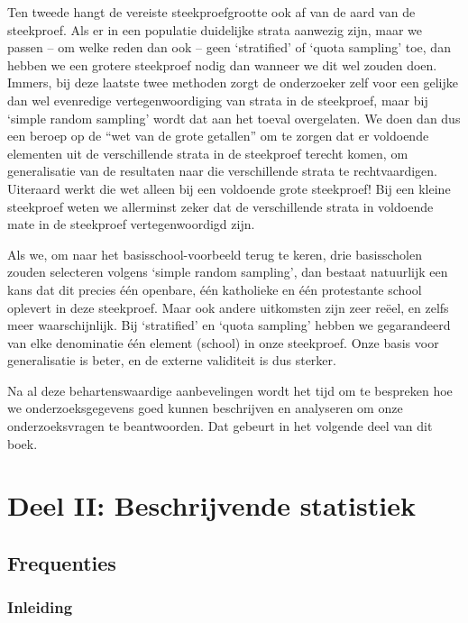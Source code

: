 \documentclass[
]{book}
\begin{document}
Ten tweede hangt de vereiste steekproefgrootte ook af van de aard van de
steekproef. Als er in een populatie duidelijke strata aanwezig zijn,
maar we passen -- om welke reden dan ook -- geen `stratified' of `quota
sampling' toe, dan hebben we een grotere steekproef nodig dan wanneer we
dit wel zouden doen. Immers, bij deze laatste twee methoden zorgt de
onderzoeker zelf voor een gelijke dan wel evenredige vertegenwoordiging
van strata in de steekproef, maar bij `simple random sampling' wordt dat
aan het toeval overgelaten. We doen dan dus een beroep op de ``wet van de
grote getallen'' om te zorgen dat er voldoende elementen uit de
verschillende strata in de steekproef terecht komen, om generalisatie
van de resultaten naar die verschillende strata te rechtvaardigen.
Uiteraard werkt die wet alleen bij een voldoende grote steekproef! Bij
een kleine steekproef weten we allerminst zeker dat de verschillende
strata in voldoende mate in de steekproef vertegenwoordigd zijn.

Als we, om naar het basisschool-voorbeeld terug te keren, drie
basisscholen zouden selecteren volgens `simple random sampling', dan
bestaat natuurlijk een kans dat dit precies één openbare, één katholieke
en één protestante school oplevert in deze steekproef. Maar ook andere
uitkomsten zijn zeer reëel, en zelfs meer waarschijnlijk. Bij
`stratified' en `quota sampling' hebben we gegarandeerd van elke
denominatie één element (school) in onze steekproef. Onze basis voor
generalisatie is beter, en de externe validiteit is dus sterker.

Na al deze behartenswaardige aanbevelingen wordt het tijd om te
bespreken hoe we onderzoeksgegevens goed kunnen beschrijven en
analyseren om onze onderzoeksvragen te beantwoorden. Dat gebeurt in het
volgende deel van dit boek.

\part*{Deel II: Beschrijvende statistiek}\label{part-deel-ii-beschrijvende-statistiek}

\chapter{Frequenties}\label{ch-frequenties}

\section{Inleiding}\label{inleiding-3}
\end{document}
